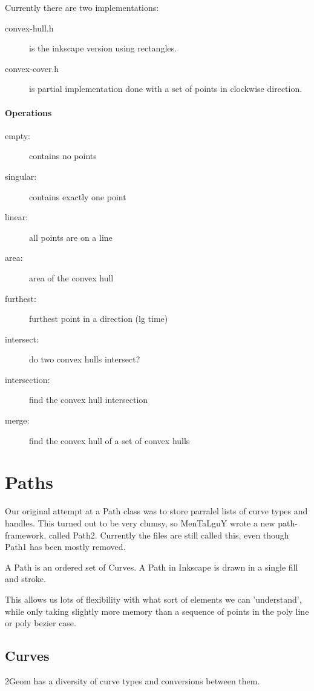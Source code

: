 \documentclass{book}
\newcommand{\code}[1]{\textsf{#1}}
\begin{document}
Currently there are two implementations:
\begin{description}
\item[convex-hull.h] is the inkscape version using rectangles.
\item[convex-cover.h] is partial implementation done with a set of points in clockwise direction.
\end{description}

\subsubsection{Operations}
\begin{description}
\item[empty:] contains no points
\item[singular:] contains exactly one point
\item[linear:] all points are on a line
\item[area:] area of the convex hull
\item[furthest:] furthest point in a direction (lg time)
\item[intersect:] do two convex hulls intersect?
\item[intersection:] find the convex hull intersection
\item[merge:] find the convex hull of a set of convex hulls
\end{description}

\chapter{Paths}

Our original attempt at a \code{Path} class was to store parralel
lists of curve types and handles.  This turned out to be very clumsy,
so MenTaLguY wrote a new path-framework, called Path2.  Currently the
files are still called this, even though Path1 has been mostly
removed.

A \code{Path} is an ordered set of \code{Curve}s.  A \code{Path} in
Inkscape is drawn in a single fill and stroke.

This allows us lots of flexibility with what sort of elements we can
'understand', while only taking slightly more memory than a sequence
of points in the poly line or poly bezier case. 

\section{Curves}
2Geom has a diversity of curve types and conversions between them.
\end{document}
